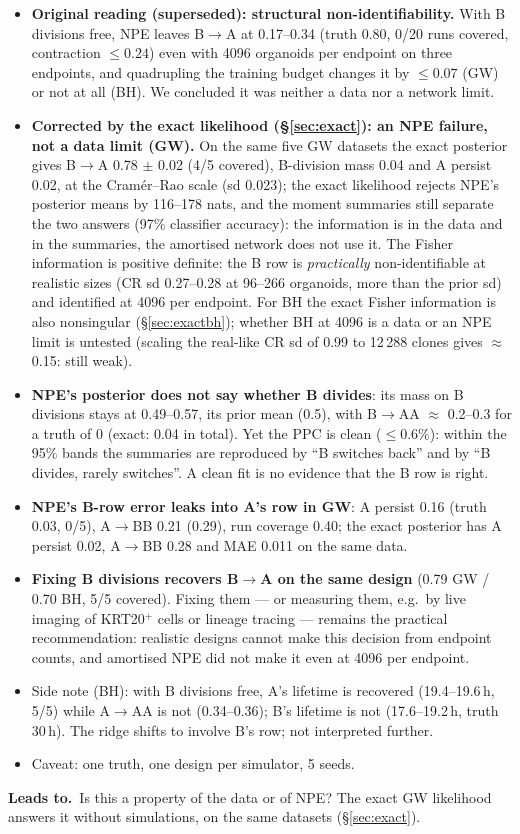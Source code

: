 \documentclass[10pt,a4paper]{article}
\newcommand{\Leads}[1]{\begin{leadbox}{\sffamily\bfseries\color{caqua!70!black}Leads to.}\ #1\end{leadbox}}
\newcommand{\sref}[1]{\S\ref{#1}}
\begin{document}
\begin{itemize}
\item \textbf{Original reading (superseded): structural non-identifiability.} With B divisions free, NPE leaves B$\to$A at 0.17--0.34 (truth 0.80, 0/20 runs covered, contraction $\le 0.24$) even with 4096 organoids per endpoint on three endpoints, and quadrupling the training budget changes it by $\le 0.07$ (GW) or not at all (BH). We concluded it was neither a data nor a network limit.
\item \textbf{Corrected by the exact likelihood (\S\ref{sec:exact}): an NPE failure, not a data limit (GW).} On the same five GW datasets the exact posterior gives B$\to$A 0.78 $\pm$ 0.02 (4/5 covered), B-division mass 0.04 and A persist 0.02, at the Cram\'er--Rao scale (sd 0.023); the exact likelihood rejects NPE's posterior means by 116--178 nats, and the moment summaries still separate the two answers (97\% classifier accuracy): the information is in the data and in the summaries, the amortised network does not use it. The Fisher information is positive definite: the B row is \emph{practically} non-identifiable at realistic sizes (CR sd 0.27--0.28 at 96--266 organoids, more than the prior sd) and identified at 4096 per endpoint. For BH the exact Fisher information is also nonsingular (\sref{sec:exactbh}); whether BH at 4096 is a data or an NPE limit is untested (scaling the real-like CR sd of 0.99 to 12\,288 clones gives $\approx$\,0.15: still weak).
\item \textbf{NPE's posterior does not say whether B divides}: its mass on B divisions stays at 0.49--0.57, its prior mean (0.5), with B$\to$AA $\approx$ 0.2--0.3 for a truth of 0 (exact: 0.04 in total). Yet the PPC is clean ($\le 0.6\%$): within the 95\% bands the summaries are reproduced by ``B switches back'' and by ``B divides, rarely switches''. A clean fit is no evidence that the B row is right.
\item \textbf{NPE's B-row error leaks into A's row in GW}: A persist 0.16 (truth 0.03, 0/5), A$\to$BB 0.21 (0.29), run coverage 0.40; the exact posterior has A persist 0.02, A$\to$BB 0.28 and MAE 0.011 on the same data.
\item \textbf{Fixing B divisions recovers B$\to$A on the same design} (0.79 GW / 0.70 BH, 5/5 covered). Fixing them --- or measuring them, e.g.\ by live imaging of KRT20$^+$ cells or lineage tracing --- remains the practical recommendation: realistic designs cannot make this decision from endpoint counts, and amortised NPE did not make it even at 4096 per endpoint.
\item Side note (BH): with B divisions free, A's lifetime is recovered (19.4--19.6\,h, 5/5) while A$\to$AA is not (0.34--0.36); B's lifetime is not (17.6--19.2\,h, truth 30\,h). The ridge shifts to involve B's row; not interpreted further.
\item Caveat: one truth, one design per simulator, 5 seeds.
\end{itemize}
\Leads{Is this a property of the data or of NPE? The exact GW likelihood answers it without simulations, on the same datasets (\sref{sec:exact}).}
\end{document}
